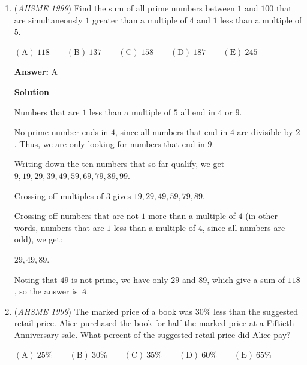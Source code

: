 \begin{enumerate}
 Answer $D$ is equivalent to $0.\overline{1}$, which is $0.0\overline{1}$ away from $0.1$, and is $0.013\overline{8}$ away from $0.125$.  These distances are not equal, eliminating $D$.

 Thus, $\boxed{E}$ must be the answer.  Computing $\frac{9}{80} = 0.1125$ as a check, we see that it is $0.1125 - 0.1 = 0.0125$ away from $\frac{1}{10}$, and similarly it is $0.125 - 0.1125 = 0.0125$ away from $\frac{1}{8}$.

 


	\item (\textit{AHSME 1999}) Find the sum of all prime numbers between $1$ and $100$ that are simultaneously $1$ greater than a multiple of $4$ and $1$ less than a multiple of $5$. 


 $\mathrm{(A) \ } 118 \qquad \mathrm{(B) \ }137 \qquad \mathrm{(C) \ } 158 \qquad \mathrm{(D) \ } 187 \qquad \mathrm{(E) \ } 245$

 \textbf{Answer: }A



\textbf{Solution}

Numbers that are $1$ less than a multiple of $5$ all end in $4$ or $9$.

 No prime number ends in $4$, since all numbers that end in $4$ are divisible by $2$.  Thus, we are only looking for numbers that end in $9$.

 Writing down the ten numbers that so far qualify, we get $9, 19, 29, 39, 49, 59, 69, 79, 89, 99$.

 Crossing off multiples of $3$ gives $19, 29, 49, 59, 79, 89$.

 Crossing off numbers that are not $1$ more than a multiple of $4$ (in other words, numbers that are $1$ less than a multiple of $4$, since all numbers are odd), we get:

 $29, 49, 89.$

 Noting that $49$ is not prime, we have only $29$ and $89$, which give a sum of $118$, so the answer is $\boxed{A}$.

 


	\item (\textit{AHSME 1999}) The marked price of a book was $30 \%$ less than the suggested retail price. Alice purchased the book for half the marked price at a Fiftieth Anniversary sale. What percent of the suggested retail price did Alice pay?


 $\mathrm{(A) \ }25 \% \qquad \mathrm{(B) \ }30 \% \qquad \mathrm{(C) \ }35 \% \qquad \mathrm{(D) \ }60 \% \qquad \mathrm{(E) \ }65 \%$


\end{enumerate}
